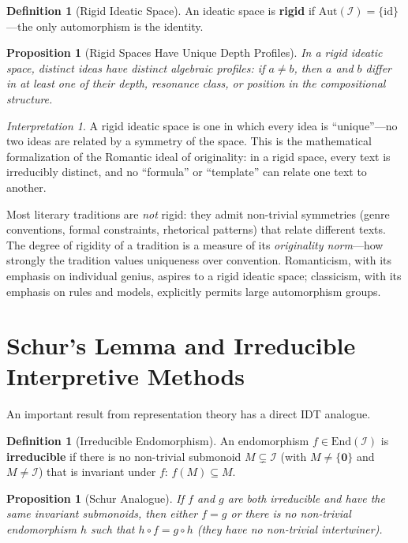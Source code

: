 \documentclass[11pt,openany]{book}
\theoremstyle{definition}
\newtheorem{definition}[axiom]{Definition}
\theoremstyle{plain}
\newtheorem{proposition}[axiom]{Proposition}
\theoremstyle{remark}
\newtheorem{interpretation}[axiom]{Interpretation}
\newcommand{\IS}{\mathcal{I}}               %
\newcommand{\void}{\mathbf{0}}              %
\begin{document}
\begin{definition}[Rigid Ideatic Space]
An ideatic space is \textbf{rigid} if $\mathrm{Aut}(\IS) = \{\mathrm{id}\}$---the only automorphism is the identity.
\end{definition}

\begin{proposition}[Rigid Spaces Have Unique Depth Profiles]
In a rigid ideatic space, distinct ideas have distinct algebraic profiles: if $a \neq b$, then $a$ and $b$ differ in at least one of their depth, resonance class, or position in the compositional structure.
\end{proposition}

\begin{interpretation}
A rigid ideatic space is one in which every idea is ``unique''---no two ideas are related by a symmetry of the space. This is the mathematical formalization of the Romantic ideal of originality: in a rigid space, every text is irreducibly distinct, and no ``formula'' or ``template'' can relate one text to another.

Most literary traditions are \emph{not} rigid: they admit non-trivial symmetries (genre conventions, formal constraints, rhetorical patterns) that relate different texts. The degree of rigidity of a tradition is a measure of its \emph{originality norm}---how strongly the tradition values uniqueness over convention. Romanticism, with its emphasis on individual genius, aspires to a rigid ideatic space; classicism, with its emphasis on rules and models, explicitly permits large automorphism groups.
\end{interpretation}

\section{Schur's Lemma and Irreducible Interpretive Methods}

An important result from representation theory has a direct IDT analogue.

\begin{definition}[Irreducible Endomorphism]
An endomorphism $f \in \mathrm{End}(\IS)$ is \textbf{irreducible} if there is no non-trivial submonoid $M \subsetneq \IS$ (with $M \neq \{\void\}$ and $M \neq \IS$) that is invariant under $f$: $f(M) \subseteq M$.
\end{definition}

\begin{proposition}[Schur Analogue]
If $f$ and $g$ are both irreducible and have the same invariant submonoids, then either $f = g$ or there is no non-trivial endomorphism $h$ such that $h \circ f = g \circ h$ (they have no non-trivial intertwiner).
\end{proposition}
\end{document}
